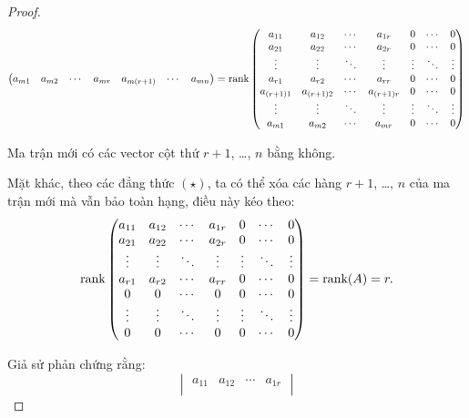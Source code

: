 \documentclass[class=nhvh-linear-algebra,crop=false]{standalone}
\begin{document}
\begin{proof}
\[\begin{pmatrix}
            a_{m1}     & a_{m2}     & \cdots & a_{mr}     & a_{m(r+1)}     & \cdots & a_{mn}
        \end{pmatrix}
        =
        \text{rank}
        \begin{pmatrix}
            a_{11}     & a_{12}     & \cdots & a_{1r}     & 0      & \cdots & 0      \\
            a_{21}     & a_{22}     & \cdots & a_{2r}     & 0      & \cdots & 0      \\
            \vdots     & \vdots     & \ddots & \vdots     & \vdots & \ddots & \vdots \\
            a_{r1}     & a_{r2}     & \cdots & a_{rr}     & 0      & \cdots & 0      \\
            a_{(r+1)1} & a_{(r+1)2} & \cdots & a_{(r+1)r} & 0      & \cdots & 0      \\
            \vdots     & \vdots     & \ddots & \vdots     & \vdots & \ddots & \vdots \\
            a_{m1}     & a_{m2}     & \cdots & a_{mr}     & 0      & \cdots & 0
        \end{pmatrix}
    \]
    \par Ma trận mới có các vector cột thứ $r+1$, \ldots, $n$ bằng không.
    \par Mặt khác, theo các đẳng thức $(\star)$, ta có thể xóa các hàng $r+1$, \ldots, $n$ của ma trận mới mà vẫn bảo toàn hạng, điều này kéo theo:
    \[
        \text{rank}
        \begin{pmatrix}
            a_{11} & a_{12} & \cdots & a_{1r} & 0      & \cdots & 0      \\
            a_{21} & a_{22} & \cdots & a_{2r} & 0      & \cdots & 0      \\
            \vdots & \vdots & \ddots & \vdots & \vdots & \ddots & \vdots \\
            a_{r1} & a_{r2} & \cdots & a_{rr} & 0      & \cdots & 0      \\
            0      & 0      & \cdots & 0      & 0      & \cdots & 0      \\
            \vdots & \vdots & \ddots & \vdots & \vdots & \ddots & \vdots \\
            0      & 0      & \cdots & 0      & 0      & \cdots & 0
        \end{pmatrix}
        = \text{rank}(A) = r.
    \]
    \par Giả sử phản chứng rằng:
    \[
        \begin{vmatrix}
            a_{11} & a_{12} & \cdots & a_{1r} \\

\end{vmatrix}\]
\end{proof}
\end{document}
